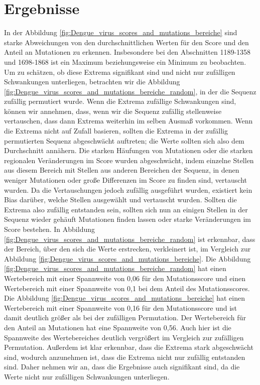 \documentclass[german,version-2022-01]{uzl-thesis}
\begin{document}
\section{Ergebnisse}
In der Abbildung \ref{fig:Dengue_virus_scores_and_mutations_bereiche} sind starke Abweichungen von den durchschnittlichen Werten f\"ur den Score und den Anteil an Mutationen zu erkennen. Insbesondere bei den Abschnitten 1189-1358 und 1698-1868 ist ein Maximum beziehungsweise ein Minimum zu beobachten. Um zu sch\"atzen, ob diese Extrema signifikant sind und nicht nur zuf\"alligen Schwankungen unterliegen, betrachten wir die Abbildung \ref{fig:Dengue_virus_scores_and_mutations_bereiche_random}, in der die Sequenz zuf\"allig permutiert wurde. Wenn die Extrema zuf\"allige Schwankungen sind, k\"onnen wir annehmen, dass, wenn wir die Sequenz zuf\"allig stellenweise vertauschen, dass dann Extrema weiterhin im selben Ausma\ss{} vorkommen. Wenn die Extrema nicht auf Zufall basieren, sollten die Extrema in der zuf\"allig permutierten Sequenz abgeschw\"acht auftreten; die Werte sollten sich also dem Durchschnitt ann\"ahern. Die starken H\"aufungen von Mutationen oder die starken regionalen Ver\"anderungen im Score wurden abgeschw\"acht, indem einzelne Stellen aus diesem Bereich mit Stellen aus anderen Bereichen der Sequenz, in denen weniger Mutationen oder gro\ss{}e Differenzen im Score zu finden sind, vertauscht wurden. Da die Vertauschungen jedoch zuf\"allig ausgef\"uhrt wurden, existiert kein Bias dar\"uber, welche Stellen ausgew\"ahlt und vertauscht wurden. Sollten die Extrema also zuf\"allig entstanden sein, sollten sich nun an einigen Stellen in der Sequenz wieder geh\"auft Mutationen finden lassen oder starke Ver\"anderungen im Score bestehen. 
In Abbildung \ref{fig:Dengue_virus_scores_and_mutations_bereiche_random} ist erkennbar, dass der Bereich, \"uber den sich die Werte erstrecken, verkleinert ist, im Vergleich zur Abbildung \ref{fig:Dengue_virus_scores_and_mutations_bereiche}. Die Abbildung \ref{fig:Dengue_virus_scores_and_mutations_bereiche_random} hat einen Wertebereich mit einer Spannweite von 0,06 f\"ur den Mutationsscore und einen Wertebereich mit einer Spannweite von 0,1 bei dem Anteil des Mutationsscores. Die Abbildung \ref{fig:Dengue_virus_scores_and_mutations_bereiche} hat einen Wertebereich mit einer Spannweite von 0,16 f\"ur den Mutationsscore und ist damit deutlich gr\"o\ss{}er als bei der zuf\"alligen Permutation. Der Wertebereich f\"ur den Anteil an Mutationen hat eine Spannweite von 0,56. Auch hier ist die Spannweite des Wertebereiches deutlich vergr\"o\ss{}ert im Vergleich zur zuf\"alligen Permutation. Au\ss{}erdem ist klar erkennbar, dass die Extrema stark abgeschw\"acht sind, wodurch anzunehmen ist, dass die Extrema nicht nur zuf\"allig entstanden sind. Daher nehmen wir an, dass die Ergebnisse auch signifikant sind, da die Werte nicht nur zuf\"alligen Schwankungen unterliegen.  
\end{document}
